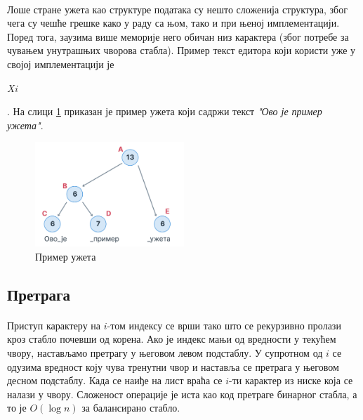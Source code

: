 \documentclass[12pt,oneside]{memoir}
\begin{document}
\paragraph{}
Лоше стране ужета као структуре података су нешто сложенија структура, због чега су чешће грешке како у раду са њом, тако и при њеној имплементацији. Поред тога, заузима више меморије него обичан низ
карактера (због потребе за чувањем унутрашњих чворова стабла). Пример текст едитора који
користи уже у својој имплементацији је \begin{latinica}\textit{Xi}\end{latinica} \cite{Xi}.
На слици \ref{fig:rope_example} приказан је пример ужета који садржи текст 
\textit{"Ово је пример ужета"}.

\begin{figure}[!ht]
	\centering
	\includegraphics[width=0.5\textwidth]{images/rope_example.png}
	\caption{Пример ужета}
	\label{fig:rope_example}
\end{figure}

\subsection{Претрага}
\paragraph{}
Приступ карактеру на \(i\)-том  индексу се врши тако што се рекурзивно пролази кроз стабло 
почевши од корена. Ако је индекс мањи од вредности у текућем чвору, настављамо претрагу у његовом левом подстаблу. У супротном од \(i\) се одузима вредност коју чува тренутни 
чвор и наставља се претрага у његовом десном подстаблу. Када се наиђе на лист враћа се
\(i\)-ти карактер из ниске која се налази у чвору. Сложеност операције је иста као код
претраге бинарног стабла, а то је \(O(\log{}n)\) за балансирано стабло. 
\end{document}

